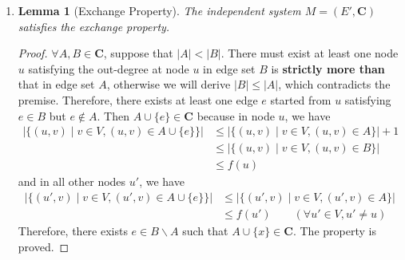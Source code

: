 \documentclass[12pt,a4paper]{article}
\makeatletter
\newtheorem{lemma}[theorem]{Lemma}
\newtheorem*{solution}{Solution}
\theoremstyle{definition}
\renewenvironment{solution}[1][Solution] {\par\pushQED{\qed}\normalfont\topsep6\p@\@plus6\p@\relax\trivlist\item[\hskip\labelsep\bfseries#1\@addpunct{.}]\ignorespaces}{\popQED\endtrivlist\@endpefalse} \makeatother
\makeatother
\begin{document}
\begin{enumerate}
\begin{solution}
\begin{enumerate}
        \begin{lemma}[Exchange Property]\label{lemma2}
        The independent system $M = (E', \mathbf{C})$ satisfies the exchange property.
        \end{lemma}
        \begin{proof}
        $\forall A, B \in \mathbf{C}$, suppose that $|A| < |B|$. There must exist at least one node $u$ satisfying the out-degree at node $u$ in edge set $B$ is \textbf{strictly more than} that in edge set $A$, otherwise we will derive $|B| \leq |A|$, which contradicts the premise. Therefore, there exists at least one edge $e$ started from $u$ satisfying $e \in B$ but $e \notin A$. Then $A \cup \{e\} \in \mathbf{C}$ because in node $u$, we have
        \begin{displaymath}
        \begin{aligned}
        \left|\{(u, v) \mid v \in V, (u, v) \in A \cup \{e\} \}\right| &\leq \left|\{(u, v) \mid v \in V, (u, v) \in A\}\right| + 1 \\
                                                                       &\leq \left|\{(u, v) \mid v \in V, (u, v) \in B\}\right| \\
                                                                       &\leq f(u)
        \end{aligned}
        \end{displaymath}
        and in all other nodes $u'$, we have
        \begin{displaymath}
        \begin{aligned}
        \left|\{(u', v) \mid v \in V, (u', v) \in A \cup \{e\} \}\right| & \leq \left|\{(u', v) \mid v \in V, (u', v) \in A\}\right| \\
                                                                         & \leq f(u') \quad \quad (\forall u'\in V, u' \ne u)
        \end{aligned}
        \end{displaymath}
        Therefore, there exists $e \in B \backslash A$ such that $A \cup \{x\} \in \mathbf{C}$. The property is proved.
        \end{proof}


\end{enumerate}
\end{solution}
\end{enumerate}
\end{document}
